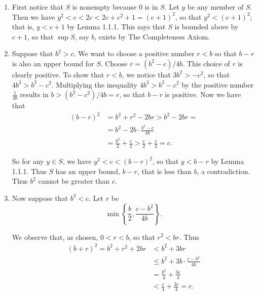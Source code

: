 \begin{enumerate}
      \begin{enumerate}
         \item First notice that $S$ is nonempty because 0 is in $S$. Let $y$
               be any member of $S$. Then we have
               $y^2 < c < 2c < 2c + c^2 + 1 = (c + 1)^2$, so that
               $y^2 < (c + 1)^2$; that is, $y < c + 1$ by Lemma 1.1.1. This says 
               that $S$ is bounded above by $c + 1$, so that $\sup S$, say $b$, 
               exists by The Completeness Axiom.
         \item Suppose that $b^2 > c$. We want to choose a positive number
               $r < b$ so that $b - r$ is also an upper bound for $S$.
               Choose $r = (b^2 - c)/4b$. This choice of $r$ is clearly
               positive. To show that $r < b$, we notice that $3b^2 > -c^2$, so
               that $4b^2 > b^2 - c^2$. Multiplying the inequality
               $4b^2 > b^2 - c^2$ by the positive number $\frac{1}{4b}$ results
               in $b > (b^2 - c^2)/4b = r$, so that $b - r$ is positive. Now
               we have that
               \begin{align*}
                  (b - r)^2 &= b^2 + r^2 - 2br > b^2 - 2br = \\
                            &= b^2 - 2b \cdot \frac{b^2 - c}{4b} \\
                            &= \frac{b^2}{2} + \frac{c}{2} >
                            \frac{c}{2} + \frac{c}{2} = c.
               \end{align*}
               
               So for any $y \in S$, we have $y^2 < c < (b - r)^2$, so that
               $y < b - r$ by Lemma 1.1.1. Thus $S$ has an upper bound, $b - r$, 
               that is less than $b$, a contradiction. Thus $b^2$ cannot be 
               greater than $c$.
         \item Now suppose that $b^2 < c$. Let $r$ be
               $$\min\left\{\frac{b}{2}, \frac{c - b^2}{4b}\right\}.$$
               
               We observe that, as chosen, $0 < r < b$, so that $r^2 < br$.
               Thus
               \begin{align*}
                  (b + r)^2 = b^2 + r^2 + 2br &< b^2 + 3br \\
                  &\le b^2 + 3b \cdot \frac{c - b^2}{4b} \\
                  &= \frac{b^2}{4} + \frac{3c}{4} \\
                  &< \frac{c}{4} + \frac{3c}{4} = c.
               \end{align*}
               

\end{enumerate}
\end{enumerate}
